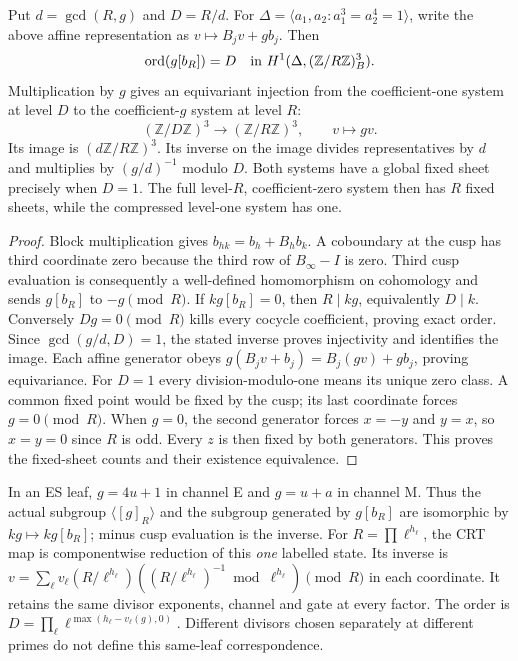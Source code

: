 \begin{proposition}
Put $d=\gcd(R,g)$ and $D=R/d$. For
$\Delta=\langle a_1,a_2:a_1^3=a_2^4=1\rangle$, write the above affine
representation as $v\mapsto B_jv+g b_j$. Then
\[
 \operatorname{ord}(g[b_R])=D
 \quad\hbox{in }H^1(\Delta,(\mathbb Z/R\mathbb Z)^3_B).
\]
Multiplication by $g$ gives an equivariant injection from the coefficient-one
system at level $D$ to the coefficient-$g$ system at level $R$:
\[
 (\mathbb Z/D\mathbb Z)^3\longrightarrow(\mathbb Z/R\mathbb Z)^3,
 \qquad v\longmapsto gv.
\]
Its image is $(d\mathbb Z/R\mathbb Z)^3$. Its inverse on the image divides
representatives by $d$ and multiplies by $(g/d)^{-1}$ modulo $D$.
Both systems have a global fixed sheet precisely when $D=1$. The full
level-$R$, coefficient-zero system then has $R$ fixed sheets, while the
compressed level-one system has one.
\end{proposition}
\begin{proof}
Block multiplication gives $b_{hk}=b_h+B_hb_k$. A coboundary at the cusp
has third coordinate zero because the third row of $B_\infty-I$ is zero.
Third cusp evaluation is consequently a well-defined homomorphism on
cohomology and sends $g[b_R]$ to $-g\pmod R$. If $k g[b_R]=0$, then
$R\mid kg$, equivalently $D\mid k$. Conversely $Dg=0\pmod R$ kills every
cocycle coefficient, proving exact order.
Since $\gcd(g/d,D)=1$, the stated inverse proves injectivity and identifies
the image. Each affine generator obeys
$g(B_jv+b_j)=B_j(gv)+g b_j$, proving equivariance. For $D=1$ every
division-modulo-one means its unique zero class.
A common fixed point would be fixed by the cusp; its last coordinate forces
$g=0\pmod R$. When $g=0$, the second generator forces $x=-y$ and $y=x$,
so $x=y=0$ since $R$ is odd. Every $z$ is then fixed by both generators.
This proves the fixed-sheet counts and their existence equivalence.
\end{proof}
In an ES leaf, $g=4u+1$ in channel E and $g=u+a$ in channel M. Thus the
actual subgroup $\langle[g]_R\rangle$ and the subgroup generated by
$g[b_R]$ are isomorphic by $kg\mapsto kg[b_R]$; minus cusp evaluation is
the inverse. For $R=\prod\ell^{h_\ell}$, the CRT map is componentwise
reduction of this \emph{one} labelled state. Its inverse is
$v=\sum_\ell v_\ell (R/\ell^{h_\ell})
 ((R/\ell^{h_\ell})^{-1}\bmod\ell^{h_\ell})\pmod R$ in each coordinate.
It retains the same divisor exponents, channel and gate at every factor.
The order is $D=\prod_\ell\ell^{\max(h_\ell-v_\ell(g),0)}$.
Different divisors chosen separately at different primes do not define this
same-leaf correspondence.

